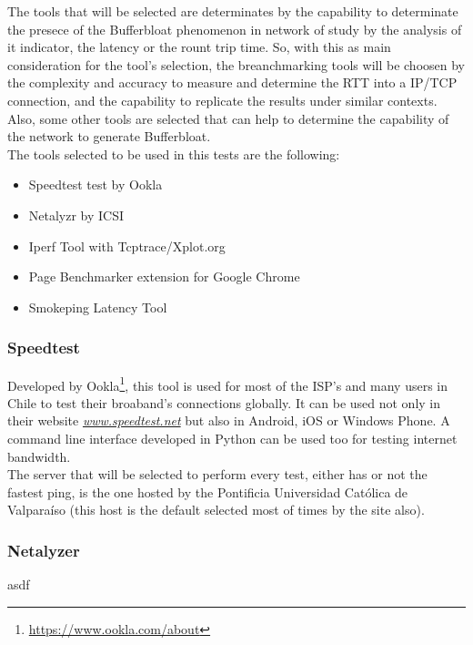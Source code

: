 The tools that will be selected are determinates by the capability to
determinate the presece of the Bufferbloat phenomenon in network of study by the 
analysis of it indicator, the latency or the rount trip time. So, with this as 
main consideration for the tool's selection, the breanchmarking tools will be
choosen by the complexity and accuracy to measure and determine the RTT into a
IP/TCP connection, and the capability to replicate the results under similar 
contexts. Also, some other tools are selected that can help to determine the 
capability of the network to generate Bufferbloat.\\

The tools selected to be used in this tests are the following:

\begin{itemize}
    \item Speedtest test by Ookla
    \item Netalyzr by ICSI
    \item Iperf Tool with Tcptrace/Xplot.org
    \item Page Benchmarker extension for Google Chrome
    \item Smokeping Latency Tool
\end{itemize}

\subsubsection{Speedtest}

Developed by Ookla\footnote{\url{https://www.ookla.com/about}}, this tool is used
for most of the ISP's and many users in Chile to test their broaband's
connections globally. It can be used not only in their website 
\href{http://www.speedtest.net}{\textit{www.speedtest.net}} but also in Android,
iOS or Windows Phone. A command line interface developed in Python can be used 
too for testing internet bandwidth.\\

The server that will be selected to perform every test, either has or not the
fastest ping, is the one hosted by the Pontificia Universidad Cat\'olica de
Valpara\'iso (this host is the default selected most of times by the site also).  

\subsubsection{Netalyzer\cite{netalyzr}}

asdf


